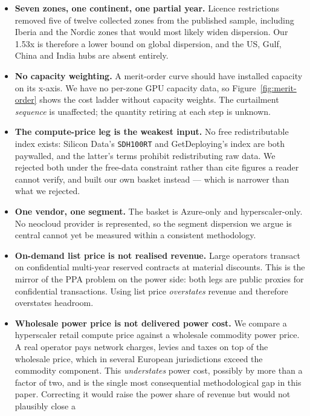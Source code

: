 \documentclass[11pt]{article}
\begin{document}
\begin{itemize}
  \item \textbf{Seven zones, one continent, one partial year.} Licence
    restrictions removed five of twelve collected zones from the published
    sample, including Iberia and the Nordic zones that would most likely
    widen dispersion. Our \num{1.53}x is therefore a lower bound on global
    dispersion, and the US, Gulf, China and India hubs are absent entirely.
  \item \textbf{No capacity weighting.} A merit-order curve should have
    installed capacity on its x-axis. We have no per-zone GPU capacity
    data, so Figure~\ref{fig:merit-order} shows the cost ladder without
    capacity weights. The curtailment \emph{sequence} is unaffected; the
    quantity retiring at each step is unknown.
  \item \textbf{The compute-price leg is the weakest input.} No free
    redistributable index exists: Silicon Data's \texttt{SDH100RT} and
    GetDeploying's index are both paywalled, and the latter's terms
    prohibit redistributing raw data. We rejected both under the free-data
    constraint rather than cite figures a reader cannot verify, and built
    our own basket instead --- which is narrower than what we rejected.
  \item \textbf{One vendor, one segment.} The basket is Azure-only and
    hyperscaler-only. No neocloud provider is represented, so the segment
    dispersion we argue is central cannot yet be measured within a
    consistent methodology.
  \item \textbf{On-demand list price is not realised revenue.} Large
    operators transact on confidential multi-year reserved contracts at
    material discounts. This is the mirror of the PPA problem on the power
    side: both legs are public proxies for confidential transactions. Using
    list price \emph{overstates} revenue and therefore overstates headroom.
  \item \textbf{Wholesale power price is not delivered power cost.} We
    compare a hyperscaler retail compute price against a wholesale
    commodity power price. A real operator pays network charges, levies and
    taxes on top of the wholesale price, which in several European
    jurisdictions exceed the commodity component. This \emph{understates}
    power cost, possibly by more than a factor of two, and is the single
    most consequential methodological gap in this paper. Correcting it
    would raise the power share of revenue but would not plausibly close a

\end{itemize}
\end{document}
